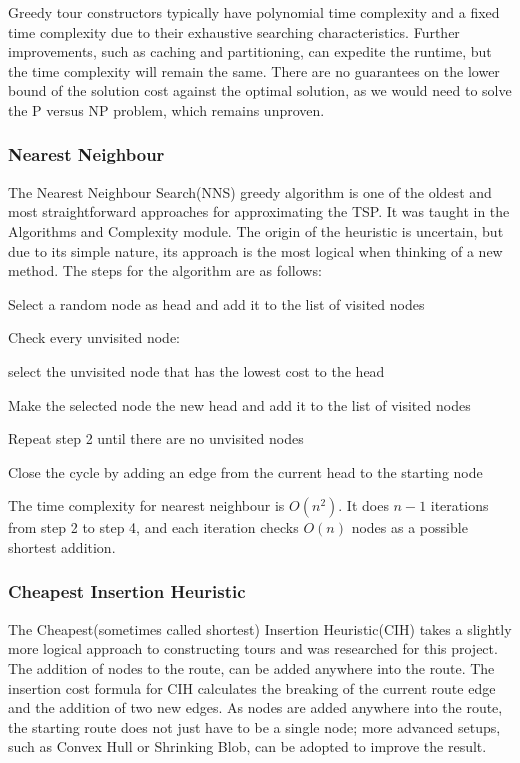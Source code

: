 Greedy tour constructors typically have polynomial time complexity and a fixed time complexity due to their exhaustive searching characteristics. Further improvements, such as caching and partitioning, can expedite the runtime, but the time complexity will remain the same. There are no guarantees on the lower bound of the solution cost against the optimal solution\cite{Vazirani2001}, as we would need to solve the P versus NP problem\cite{Vazirani2001}, which remains unproven.

\subsubsection{Nearest Neighbour}

The Nearest Neighbour Search(NNS) greedy algorithm is one of the oldest and most straightforward approaches for approximating the TSP. It was taught in the Algorithms and Complexity module. The origin of the heuristic is uncertain, but due to its simple nature, its approach is the most logical when thinking of a new method. The steps for the algorithm are as follows\cite{Nearest-neighbour}\cite{Rosenkrantz2009}:

\begin{legal}
  \item Select a random node as head and add it to the list of visited nodes
  \item Check every unvisited node:
  \begin{legal}
      \item select the unvisited node that has the lowest cost to the head
  \end{legal}
  \item Make the selected node the new head and add it to the list of visited nodes
  \item Repeat step 2 until there are no unvisited nodes
  \item Close the cycle by adding an edge from the current head to the starting node
\end{legal}

The time complexity for nearest neighbour is \(O(n^2)\)\cite{Christian-tsp}. It does \(n-1\) iterations from step 2 to step 4, and each iteration checks \(O(n)\) nodes as a possible shortest addition.

\subsubsection{Cheapest Insertion Heuristic}
\label{CIH}
The Cheapest(sometimes called shortest) Insertion Heuristic(CIH) takes a slightly more logical approach to constructing tours and was researched for this project. The addition of nodes to the route, can be added anywhere into the route\cite{Rosenkrantz2009}. The insertion cost formula for CIH calculates the breaking of the current route edge and the addition of two new edges. As nodes are added anywhere into the route, the starting route does not just have to be a single node; more advanced setups, such as Convex Hull\cite{Christian-tsp} or Shrinking Blob\cite{Jones2014}, can be adopted to improve the result\cite{jones2013computationtravellingsalesmanproblem}.


